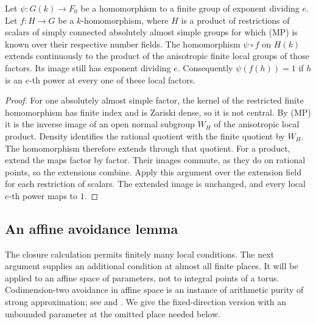 \begin{lemma}
\label{lem:restriction-mp}
Let \(\psi:G(k)\to F_0\) be a homomorphism to a finite group of
exponent dividing \(e\).  Let \(f:H\to G\) be a \(k\)-homomorphism,
where \(H\) is a product of restrictions of scalars of simply connected
absolutely almost simple groups for which (MP) is known over their
respective number fields.  The homomorphism \(\psi\circ f\) on \(H(k)\)
extends continuously to the product of the anisotropic finite local
groups of those factors.  Its image still has exponent dividing \(e\).
Consequently \(\psi(f(h))=1\) if \(h\) is an \(e\)-th power at every
one of these local factors.
\end{lemma}

\begin{proof}
For one absolutely almost simple factor, the kernel of the restricted
finite homomorphism has finite index and is Zariski dense, so it is
not central.  By (MP) it is the inverse image of an open normal
subgroup \(W_H\) of the anisotropic local product.  Density identifies
the rational quotient with the finite quotient by \(W_H\).
The homomorphism therefore extends through that quotient.
For a product, extend the maps factor by factor.  Their images
commute, as they do on rational points, so the extensions combine.
Apply this argument over the extension field for each restriction
of scalars.  The extended image is unchanged, and every local
\(e\)-th power maps to \(1\).
\end{proof}

\subsection{An affine avoidance lemma}

The closure calculation permits finitely many local conditions.
The next argument supplies an additional condition at almost all
finite places.  It will be applied to an affine space of parameters,
not to integral points of a torus.
Codimension-two avoidance in affine space is an instance of arithmetic
purity of strong approximation; see \cite[Proposition~3.6]{CaoXu2018}
and \cite[arXiv version, Lemma~1.1]{Wei2019}. We give the fixed-direction version with
an unbounded parameter at the omitted place needed below.

